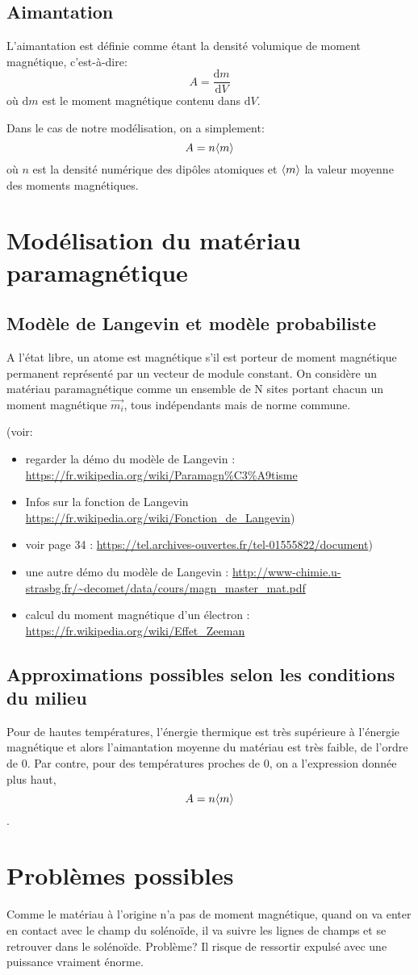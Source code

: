 \documentclass{article}
\begin{document}
\subsection{Aimantation}
L'aimantation est définie comme étant la densité volumique de moment magnétique, c'est-à-dire: $$A = \frac{\mathrm{d}m}{\mathrm{d}V}$$
où $\mathrm{d}m$ est le moment magnétique contenu dans $\mathrm{d}V$.

Dans le cas de notre modélisation, on a simplement:
$$A = n \valmoy{m}$$ où $n$ est la densité numérique des dipôles atomiques et $\valmoy{m}$ la valeur moyenne des moments magnétiques.

\section{Modélisation du matériau paramagnétique}
\subsection{Modèle de Langevin et modèle probabiliste}

A l’état libre, un atome est magnétique s’il est porteur de moment magnétique permanent représenté par un vecteur de module constant.
On considère un matériau paramagnétique comme un ensemble de N sites portant chacun un moment magnétique $\vec{m_i}$, tous indépendants mais de norme commune.

(voir:
\begin{itemize}
    \item regarder la démo du modèle de Langevin  : \url{https://fr.wikipedia.org/wiki/Paramagn%C3%A9tisme}
    \item Infos sur la fonction de Langevin \url{https://fr.wikipedia.org/wiki/Fonction_de_Langevin})
    \item voir page 34 :  \url{https://tel.archives-ouvertes.fr/tel-01555822/document})
    \item une autre démo du modèle de Langevin : \url{http://www-chimie.u-strasbg.fr/~decomet/data/cours/magn_master_mat.pdf}
    \item calcul du moment magnétique d'un électron : \url{https://fr.wikipedia.org/wiki/Effet_Zeeman}
\end{itemize} 

\subsection{Approximations possibles selon les conditions du milieu}
Pour de hautes températures, l'énergie thermique est très supérieure à l'énergie magnétique et alors l'aimantation moyenne du matériau est très faible, de l'ordre de 0. Par contre, pour des températures proches de 0, on a l'expression donnée plus haut, $$A = n \valmoy{m}$$.

\section{Problèmes possibles}
Comme le matériau à l'origine n'a pas de moment magnétique, quand on va enter en contact avec le champ du solénoïde, il va suivre les lignes de champs et se retrouver dans le solénoïde. Problème? Il risque de ressortir expulsé avec une puissance vraiment énorme.
\end{document}
